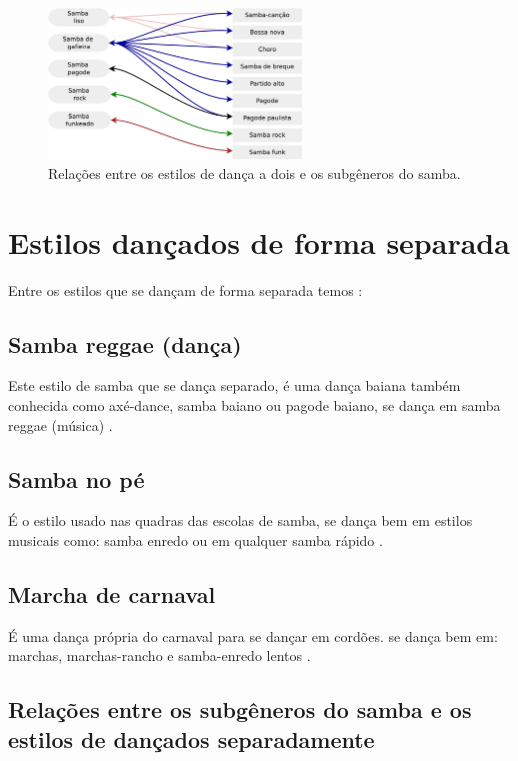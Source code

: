 \begin{figure}[h]
  \centering
    \includegraphics[width=0.6\textwidth]{chapters/cap-historia-dancasamba/dancavcmusica.eps}
  \caption{Relações entre os estilos de dança a dois e os subgêneros do samba.}
\label{fig:sambadavavsmusica}
\end{figure}

\section{Estilos dançados de forma separada}
Entre os estilos que se dançam de forma separada temos \cite[pp. 134]{perna2002samba}:

\subsection{Samba reggae  (dança)} 
Este estilo de samba que se dança separado, 
é uma dança baiana também conhecida como axé-dance, samba baiano ou pagode baiano,
se dança em samba reggae (música) \cite[pp. 134]{perna2002samba}.

\subsection{Samba no pé} 
É o estilo usado nas quadras das escolas de samba,
se dança bem em estilos musicais como: 
samba enredo ou em qualquer samba rápido  \cite[pp. 134]{perna2002samba}.

\subsection{Marcha de carnaval}
 É uma dança própria do carnaval para se dançar em cordões.
se dança bem em: marchas, marchas-rancho e samba-enredo lentos  \cite[pp. 135]{perna2002samba}.


\subsection{Relações entre os subgêneros do samba e os estilos de dançados separadamente}

